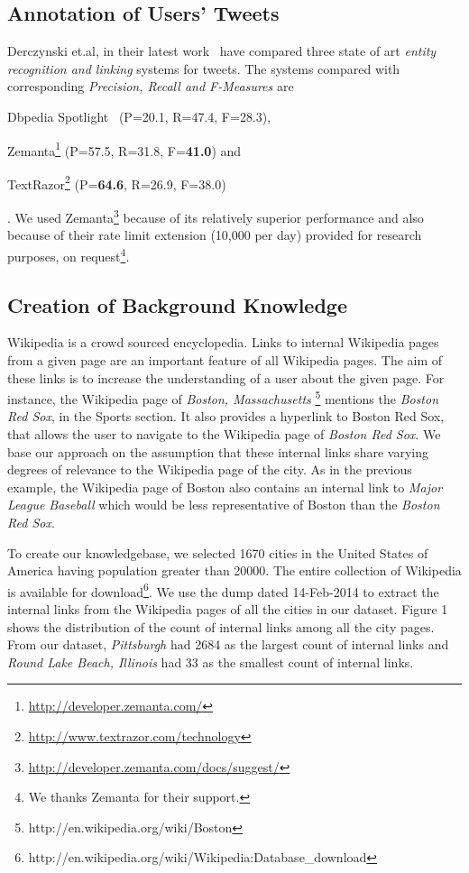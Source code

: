 \subsection{Annotation of Users' Tweets}
Derczynski et.al, in their latest work~\cite{derczynski2013} have compared three state of art \textit{entity recognition and linking} systems for tweets. The systems compared with corresponding \textit{Precision, Recall and F-Measures} are \begin{inparaenum} \item Dbpedia Spotlight~\cite{mendes2011dbpedia} (P=20.1, R=47.4, F=28.3), \item Zemanta\footnote{\url{http://developer.zemanta.com/}} (P=57.5, R=31.8, F=\textbf{41.0}) and \item TextRazor\footnote{\url{http://www.textrazor.com/technology}} (P=\textbf{64.6}, R=26.9, F=38.0) \end{inparaenum}. We used Zemanta\footnote{\url{http://developer.zemanta.com/docs/suggest/}} because of its relatively superior performance and also because of their rate limit extension (10,000 per day) provided for research purposes, on request\footnote{We thanks Zemanta for their support.}. 

\subsection{Creation of Background Knowledge}
Wikipedia is a crowd sourced encyclopedia. Links to internal Wikipedia pages from a given page are an important feature of all Wikipedia pages. The aim of these links is to increase the understanding of a user about the given page. For instance, the Wikipedia page of \textit{Boston, Massachusetts} \footnote{http://en.wikipedia.org/wiki/Boston} mentions the \textit{Boston Red Sox}, in the Sports section. It also provides a hyperlink to Boston Red Sox, that allows the user to navigate to the Wikipedia page of \textit{Boston Red Sox}. We base our approach on the assumption that these internal links share varying degrees of relevance to the Wikipedia page of the city. As in the previous example, the Wikipedia page of Boston also contains an internal link to \textit{Major League Baseball} which would be less representative of Boston than the \textit{Boston Red Sox}. 

To create our knowledgebase, we selected 1670 cities in the United States of America having population greater than 20000. The entire collection of Wikipedia is available for download\footnote{http://en.wikipedia.org/wiki/Wikipedia:Database\_download}. We use the dump dated 14-Feb-2014 to extract the internal links from the Wikipedia pages of all the cities in our dataset. Figure 1 shows the distribution of the count of internal links among all the city pages. From our dataset, \textit{Pittsburgh} had 2684 as the largest count of internal links and \textit{Round Lake Beach, Illinois} had 33 as the smallest count of internal links.

